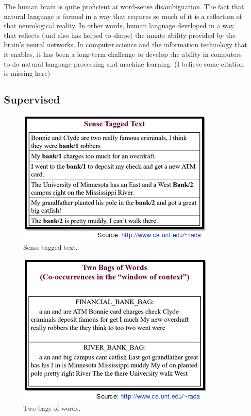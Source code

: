 The human brain is quite proficient at word-sense disambiguation. The fact that natural language is formed in a way that requires so much of it is a reflection of that neurological reality. In other words, human language developed in a way that reflects (and also has helped to shape) the innate ability provided by the brain's neural networks. In computer science and the information technology that it enables, it has been a long-term challenge to develop the ability in computers to do natural language processing and machine learning. (I believe some citation is missing here)

\subsection*{Supervised}

\begin{figure}[tbh]
	\begin{center}
		\includegraphics[width=\columnwidth]{union(sup1)}
	\end{center}
	\caption{Sense tagged text.}
\end{figure}
\begin{figure}[tbh]
	\begin{center}
		\includegraphics[width=\columnwidth]{union(sup2)}
	\end{center}
	\caption{Two bags of words.}
\end{figure}
